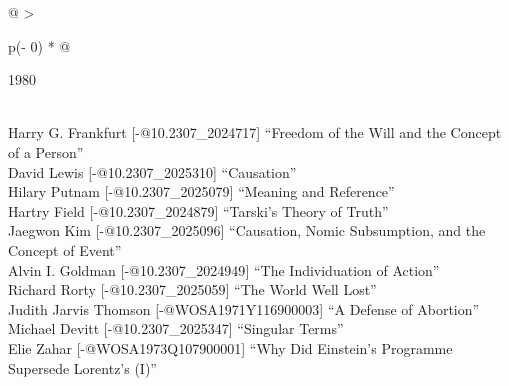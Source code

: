 \documentclass[
  10pt,
  letterpaper,
  DIV=11,
  numbers=noendperiod,
  twoside]{scrartcl}
\begin{document}
\begin{longtable}[]{@{}
  >{\raggedright\arraybackslash}p{(\columnwidth - 0\tabcolsep) * }@{}}

\caption{\label{tbl-top-ten-1971}Most cited articles published less than
ten years ago as of 1980.}

\tabularnewline

\toprule\noalign{}
\begin{minipage}[b]{\linewidth}\raggedright
1980
\end{minipage} \\
\midrule\noalign{}
\endhead
\bottomrule\noalign{}
\endlastfoot
Harry G. Frankfurt {[}-@10.2307\_2024717{]} ``Freedom of the Will and
the Concept of a Person'' \\
David Lewis {[}-@10.2307\_2025310{]} ``Causation'' \\
Hilary Putnam {[}-@10.2307\_2025079{]} ``Meaning and Reference'' \\
Hartry Field {[}-@10.2307\_2024879{]} ``Tarski's Theory of Truth'' \\
Jaegwon Kim {[}-@10.2307\_2025096{]} ``Causation, Nomic Subsumption, and
the Concept of Event'' \\
Alvin I. Goldman {[}-@10.2307\_2024949{]} ``The Individuation of
Action'' \\
Richard Rorty {[}-@10.2307\_2025059{]} ``The World Well Lost'' \\
Judith Jarvis Thomson {[}-@WOSA1971Y116900003{]} ``A Defense of
Abortion'' \\
Michael Devitt {[}-@10.2307\_2025347{]} ``Singular Terms'' \\
Elie Zahar {[}-@WOSA1973Q107900001{]} ``Why Did Einstein's Programme
Supersede Lorentz's (I)'' \\

\end{longtable}
\end{document}
